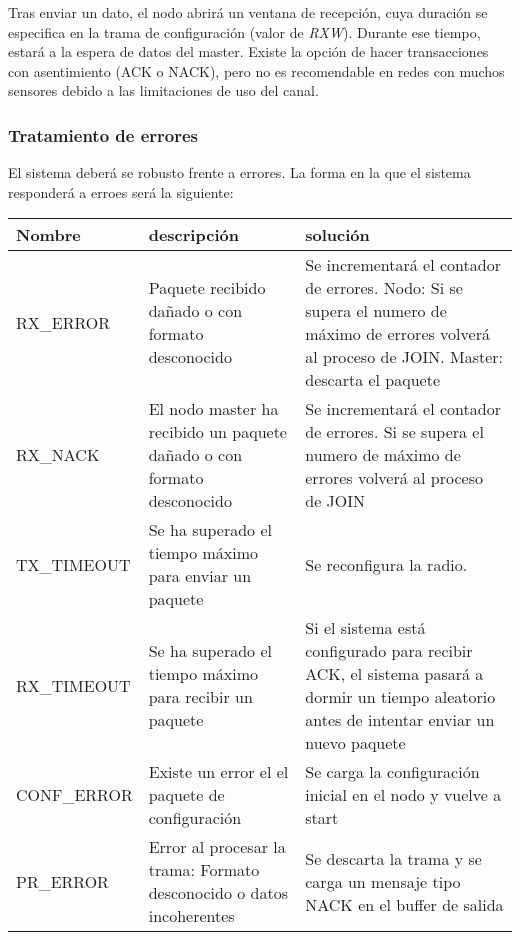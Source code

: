 	Tras enviar un dato, el nodo abrirá un ventana de recepción, cuya duración se especifica en la trama de configuración (valor de \textit{RXW}). Durante ese tiempo, estará a la espera de datos del master. Existe la opción de hacer transacciones con asentimiento (ACK o NACK), pero   no es recomendable en redes con muchos sensores debido a las limitaciones de uso del canal.
	
	
	
	\subsubsection{Tratamiento de errores} \label{ErrorHandle}
	
	El sistema deberá se robusto frente a errores. La forma en la que el sistema responderá a erroes será la siguiente:
	
	\begin{table}[!h]
			\begin{tabularx}{\textwidth}{|X|X|X|}
    			\hline
    	Nombre & descripción & solución \\
    	\hline \hline
    	
    	RX\_ERROR & Paquete recibido dañado o con formato desconocido  & Se incrementará el contador de errores. 
    	Nodo: Si se supera el numero de máximo de errores volverá al proceso de JOIN. Master: descarta el paquete  \\ \hline
    	RX\_NACK  & El nodo master ha recibido un paquete dañado o con formato desconocido &  Se incrementará el contador de errores. Si se supera el numero de máximo de errores volverá al proceso de JOIN \\ \hline
    	TX\_TIMEOUT & Se ha superado el tiempo máximo para enviar un paquete &  Se reconfigura la radio. \\ \hline
    	RX\_TIMEOUT & Se ha superado el tiempo máximo para recibir un paquete &  Si el sistema está configurado para recibir ACK, el sistema pasará a dormir un tiempo aleatorio antes de intentar enviar un nuevo paquete \\ \hline
    	CONF\_ERROR & Existe un error el el paquete de configuración & Se carga la configuración inicial en el nodo y vuelve a start \\ \hline
    	
    	      PR\_ERROR & Error al procesar la trama: Formato desconocido o datos incoherentes & Se descarta la trama y se carga un mensaje tipo NACK en el buffer de salida \\
         \hline
    	\end{tabularx}
    	
	\end{table}
	
